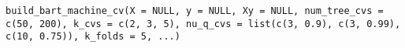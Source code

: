 \documentclass[a4paper]{book}
\begin{document}
%
\begin{Usage}
\begin{verbatim}
build_bart_machine_cv(X = NULL, y = NULL, Xy = NULL, num_tree_cvs = c(50, 200), k_cvs = c(2, 3, 5), nu_q_cvs = list(c(3, 0.9), c(3, 0.99), c(10, 0.75)), k_folds = 5, ...)
\end{verbatim}
\end{Usage}
%
\begin{Arguments}
\begin{ldescription}
\item[\code{X}] 


\item[\code{y}] 


\item[\code{Xy}] 


\item[\code{num\_tree\_cvs}] 


\item[\code{k\_cvs}] 


\item[\code{nu\_q\_cvs}] 


\item[\code{k\_folds}] 


\item[\code{...}] 


\end{ldescription}
\end{Arguments}
%
\end{document}
